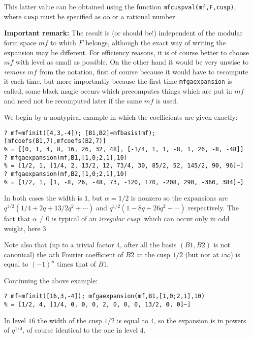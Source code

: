 \documentclass[11pt]{article}
\def\kbd#1{{\tt #1}}
\begin{document}
This latter value can be obtained using the function
\kbd{mfcuspval(mf,F,cusp)}, where \kbd{cusp} must be specified as oo or
a rational number.

{\bf Important remark:} The result is (or should be!) independent of the
modular form space $mf$ to which $F$ belongs, although the exact way of
writing the expansion may be different. For efficiency reasons, it is of
course better to choose $mf$ with level as small as possible. On the other
hand it would be very unwise to \emph{remove} $mf$ from the notation,
first of course because it would have to recompute it each time, but more
importantly because the first time \kbd{mfgaexpansion} is called, some
black magic occurs which precomputes things which are put in $mf$ and need
not be recomputed later if the same $mf$ is used.

\medskip

We begin by a nontypical example in which the coefficients are given exactly:

\begin{verbatim}
? mf=mfinit([4,3,-4]); [B1,B2]=mfbasis(mf); [mfcoefs(B1,7),mfcoefs(B2,7)]
% = [[0, 1, 4, 8, 16, 26, 32, 48], [-1/4, 1, 1, -8, 1, 26, -8, -48]]
? mfgaexpansion(mf,B1,[1,0;2,1],10)
% = [1/2, 1, [1/4, 2, 13/2, 12, 73/4, 30, 85/2, 52, 145/2, 90, 96]~]
? mfgaexpansion(mf,B2,[1,0;2,1],10)
% = [1/2, 1, [1, -8, 26, -48, 73, -120, 170, -208, 290, -360, 384]~]
\end{verbatim}

In both cases the width is $1$, but $\alpha=1/2$ is nonzero so the
expansions are $q^{1/2}(1/4+2q+13/2q^2+\cdots)$ and
$q^{1/2}(1-8q+26q^2-\cdots)$ respectively. The fact that $\alpha\ne0$ is
typical of an \emph{irregular cusp}, which can occur only in odd weight, here
$3$.

Note also that (up to a trivial factor $4$, after all the basis $(B1,B2)$
is not canonical) the $n$th Fourier coefficient of $B2$ at the cusp $1/2$ (but
not at $i\infty$) is equal to $(-1)^n$ times that of $B1$.

Continuing the above example:

\begin{verbatim}
? mf=mfinit([16,3,-4]); mfgaexpansion(mf,B1,[1,0;2,1],10)
% = [1/2, 4, [1/4, 0, 0, 0, 2, 0, 0, 0, 13/2, 0, 0]~]
\end{verbatim}

In level $16$ the width of the cusp $1/2$ is equal to $4$, so the expansion
is in powers of $q^{1/4}$, of course identical to the one in level $4$.
  
\end{document}
